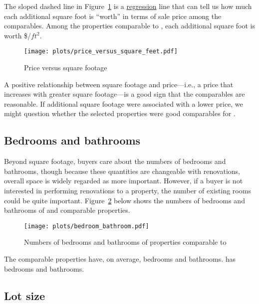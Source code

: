 \documentclass[
12pt, %
letterpaper, %
oneside, %
headinclude,footinclude, %
BCOR5mm, %
]{scrartcl}
\begin{document}
The sloped dashed line in Figure~\ref{fig:price_versus_square_feet} is a \href{https://en.wikipedia.org/wiki/Linear_regression}{regression} line that can tell us how much each additional square foot is ``worth'' in terms of sale price among the comparables.
Among the properties comparable to \PropertyName{}, each additional square foot is worth \$\MarginalPricePerFoot{}/$ft^2$. 

\begin{figure}
\centering
\caption{Price versus square footage} \label{fig:price_versus_square_feet}  
\texttt{[image: plots/price\_versus\_square\_feet.pdf]} 
\end{figure}

A positive relationship between square footage and price---i.e., a price that increases with greater square footage---is a good sign that the comparables are reasonable. If additional square footage were associated with a lower price, we might question whether the selected properties were good comparables for \PropertyName{}. 

\subsection{Bedrooms and bathrooms}
Beyond square footage, buyers care about the numbers of bedrooms and bathrooms, though because these quantities are changeable with renovations, overall space is widely regarded as more important.
However, if a buyer is not interested in performing renovations to a property, the number of existing rooms could be quite important.
Figure~\ref{fig:bedroom_bathroom} below shows the numbers of bedrooms and bathrooms of \PropertyName{} and comparable properties. 

\begin{figure}
\centering
\caption{Numbers of bedrooms and bathrooms of properties comparable to \PropertyName{}} \label{fig:bedroom_bathroom}  
\texttt{[image: plots/bedroom\_bathroom.pdf]} 
\end{figure}

The comparable properties have, on average, \AverageBedrooms{} bedrooms and \AverageBaths{} bathrooms.
\PropertyName{} has bedrooms \NumberOfBedrooms{} and \NumberOfBaths{} bathrooms.

\subsection{Lot size}
\end{document}
